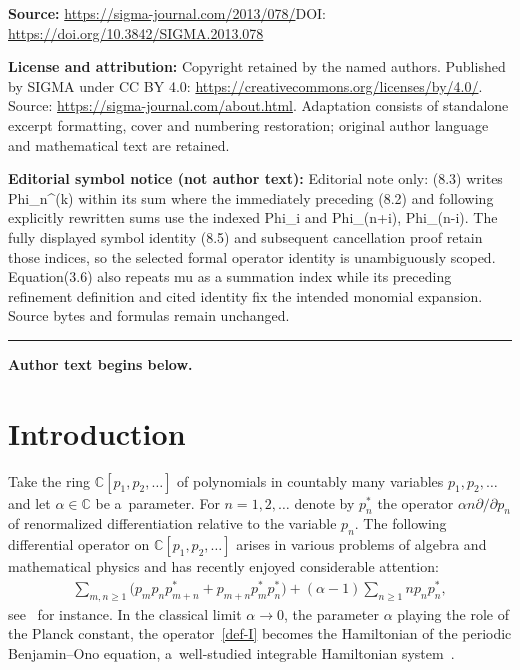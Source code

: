 \documentclass[11pt]{article}
\numberwithin{equation}{section}
\renewcommand\ge{\geqslant}
\begin{document}
\noindent\textbf{Source:} \url{https://sigma-journal.com/2013/078/}\quad DOI: \url{https://doi.org/10.3842/SIGMA.2013.078}\par
\noindent\textbf{License and attribution:} Copyright retained by the named authors. Published by SIGMA under CC BY 4.0: \url{https://creativecommons.org/licenses/by/4.0/}. Source: \url{https://sigma-journal.com/about.html}. Adaptation consists of standalone excerpt formatting, cover and numbering restoration; original author language and mathematical text are retained.\par
\noindent\textbf{Editorial symbol notice (not author text):} Editorial note only: (8.3) writes Phi\_n\textasciicircum{}(k) within its sum where the immediately preceding (8.2) and following explicitly rewritten sums use the indexed Phi\_i and Phi\_(n+\allowbreak{}i), Phi\_(n-i). The fully displayed symbol identity (8.5) and subsequent cancellation proof retain those indices, so the selected formal operator identity is unambiguously scoped. Equation(3.6) also repeats mu as a summation index while its preceding refinement definition and cited identity fix the intended monomial expansion. Source bytes and formulas remain unchanged.\par
\medskip\hrule\medskip\noindent\textbf{Author text begins below.}\par
\setcounter{section}{0}
\setcounter{subsection}{0}
\setcounter{subsubsection}{0}
\setcounter{equation}{0}
\section{Introduction}

Take the ring $\mathbb C[p_1,p_2,\ldots]$ of polynomials in countably many variables $p_1, p_2,\ldots$ and
let $\alpha\in\mathbb C$ be a~parameter.
For $n=1,2,\ldots$ denote by $p_n^{\ast}$ the operator
$\alpha n\partial/\partial p_n$ of renormalized dif\/ferentiation relative to the
variable $p_n$.
The following dif\/ferential operator on $\mathbb C[p_1,p_2,\ldots]$ arises in various problems of
algebra and mathematical physics and has recently enjoyed considerable attention:
\begin{gather}
\label{def-I}
\sum_{m,n\ge1}\big(p_mp_np_{m+n}^{\ast}+p_{m+n}p_m^{\ast}p_n^{\ast}\big)+(\alpha-1)\sum_{n\ge1}np_np_n^{\ast},
\end{gather}
see~\cite{AMOS,CJ,NS1,OP,Pol} for instance.
In the classical limit $\alpha\rightarrow0$, the parameter $\alpha$ playing the role of the Planck
constant, the operator~\eqref{def-I} becomes the Hamiltonian of the periodic Benjamin--Ono equation,
a~well-studied integrable Hamiltonian system~\cite{AFSS,B,KLM,KM,O}.
\end{document}
